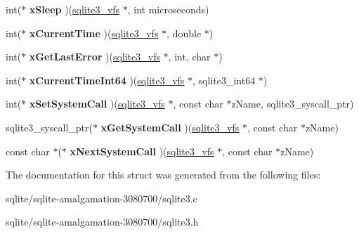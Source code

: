 \begin{DoxyCompactItemize}
\item 
\hypertarget{structsqlite3__vfs_a8ebcfaceced9713024cb8e2508fe6c1b}{int($\ast$ {\bfseries x\+Sleep} )(\hyperlink{structsqlite3__vfs}{sqlite3\+\_\+vfs} $\ast$, int microseconds)}\label{structsqlite3__vfs_a8ebcfaceced9713024cb8e2508fe6c1b}

\item 
\hypertarget{structsqlite3__vfs_ab85a8a3ab59f76a6685508fefaa7b691}{int($\ast$ {\bfseries x\+Current\+Time} )(\hyperlink{structsqlite3__vfs}{sqlite3\+\_\+vfs} $\ast$, double $\ast$)}\label{structsqlite3__vfs_ab85a8a3ab59f76a6685508fefaa7b691}

\item 
\hypertarget{structsqlite3__vfs_a4994110c79d082f7770ce553d507748f}{int($\ast$ {\bfseries x\+Get\+Last\+Error} )(\hyperlink{structsqlite3__vfs}{sqlite3\+\_\+vfs} $\ast$, int, char $\ast$)}\label{structsqlite3__vfs_a4994110c79d082f7770ce553d507748f}

\item 
\hypertarget{structsqlite3__vfs_aa281584c422969b7f0df0e5f918fc590}{int($\ast$ {\bfseries x\+Current\+Time\+Int64} )(\hyperlink{structsqlite3__vfs}{sqlite3\+\_\+vfs} $\ast$, sqlite3\+\_\+int64 $\ast$)}\label{structsqlite3__vfs_aa281584c422969b7f0df0e5f918fc590}

\item 
\hypertarget{structsqlite3__vfs_a69996d40229d6eabe6869bb3fc80b730}{int($\ast$ {\bfseries x\+Set\+System\+Call} )(\hyperlink{structsqlite3__vfs}{sqlite3\+\_\+vfs} $\ast$, const char $\ast$z\+Name, sqlite3\+\_\+syscall\+\_\+ptr)}\label{structsqlite3__vfs_a69996d40229d6eabe6869bb3fc80b730}

\item 
\hypertarget{structsqlite3__vfs_a604384e58c645e06b6db38d8a45e1103}{sqlite3\+\_\+syscall\+\_\+ptr($\ast$ {\bfseries x\+Get\+System\+Call} )(\hyperlink{structsqlite3__vfs}{sqlite3\+\_\+vfs} $\ast$, const char $\ast$z\+Name)}\label{structsqlite3__vfs_a604384e58c645e06b6db38d8a45e1103}

\item 
\hypertarget{structsqlite3__vfs_ac2930d34749977f39b1bbc27dc1de2b2}{const char $\ast$($\ast$ {\bfseries x\+Next\+System\+Call} )(\hyperlink{structsqlite3__vfs}{sqlite3\+\_\+vfs} $\ast$, const char $\ast$z\+Name)}\label{structsqlite3__vfs_ac2930d34749977f39b1bbc27dc1de2b2}

\end{DoxyCompactItemize}


The documentation for this struct was generated from the following files\+:\begin{DoxyCompactItemize}
\item 
sqlite/sqlite-\/amalgamation-\/3080700/sqlite3.\+c\item 
sqlite/sqlite-\/amalgamation-\/3080700/sqlite3.\+h\end{DoxyCompactItemize}
